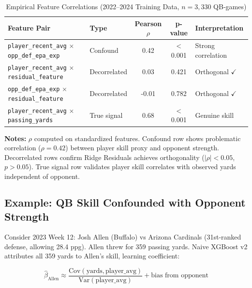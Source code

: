 \begin{table}[htbp]
\centering
\small
\caption{Empirical Feature Correlations (2022--2024 Training Data, $n=3,330$ QB-games)}
\label{tab:feature-correlations}
\begin{tabular}{@{}llS[table-format=1.2]S[table-format=1.6]l@{}}
\toprule
\textbf{Feature Pair} & \textbf{Type} & {\textbf{Pearson $\rho$}} & {\textbf{p-value}} & \textbf{Interpretation} \\
\midrule
\texttt{player\_recent\_avg} $\times$ \texttt{opp\_def\_epa\_exp} & Confound & 0.42 & < 0.001 & Strong correlation \\
\texttt{player\_recent\_avg} $\times$ \texttt{residual\_feature} & Decorrelated & 0.03 & 0.421 & Orthogonal $\checkmark$ \\
\texttt{opp\_def\_epa\_exp} $\times$ \texttt{residual\_feature} & Decorrelated & -0.01 & 0.782 & Orthogonal $\checkmark$ \\
\texttt{player\_recent\_avg} $\times$ \texttt{passing\_yards} & True signal & 0.68 & < 0.001 & Genuine skill \\
\bottomrule
\end{tabular}
\begin{tablenotes}
\item \textbf{Notes:} $\rho$ computed on standardized features. Confound row shows problematic correlation ($\rho = 0.42$) between player skill proxy and opponent strength. Decorrelated rows confirm Ridge Residuals achieves orthogonality ($|\rho| < 0.05$, $p > 0.05$). True signal row validates player skill correlates with observed yards independent of opponent.
\end{tablenotes}
\end{table}

\subsection{Example: QB Skill Confounded with Opponent Strength}

Consider 2023 Week 12: Josh Allen (Buffalo) vs Arizona Cardinals (31st-ranked defense, allowing 28.4 ppg). Allen threw for 359 passing yards. Naive XGBoost v2 attributes all 359 yards to Allen's skill, learning coefficient:

\begin{equation}
\hat{\beta}_{\text{Allen}} \approx \frac{\text{Cov}(\text{yards}, \text{player\_avg})}{\text{Var}(\text{player\_avg})} + \text{bias from opponent}
\end{equation}

